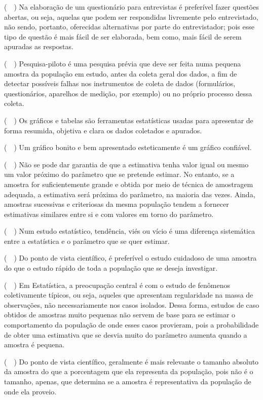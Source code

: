 \begin{enumerate}
	\subitem (~~) Na elaboração de um questionário para entrevistas é preferível fazer questões abertas,
ou seja, aquelas que podem ser respondidas livremente pelo entrevistado, não sendo,
portanto, oferecidas alternativas por parte do entrevistador; pois esse tipo de questão é
mais fácil de ser elaborada, bem como, mais fácil de serem apuradas as respostas.
	
	\subitem (~~) Pesquisa-piloto é uma pesquisa prévia que deve ser feita numa pequena amostra da
população em estudo, antes da coleta geral dos dados, a fim de detectar possíveis
falhas nos instrumentos de coleta de dados (formulários, questionários, aparelhos de
medição, por exemplo) ou no próprio processo dessa coleta.
		
	\subitem (~~) Os gráficos e tabelas são ferramentas estatísticas usadas para apresentar de forma
resumida, objetiva e clara os dados coletados e apurados.
	
	\subitem (~~) Um gráfico bonito e bem apresentado esteticamente é um gráfico confiável.
	
	\subitem (~~) Não se pode dar garantia de que a estimativa tenha valor igual ou mesmo um valor
próximo do parâmetro que se pretende estimar. No entanto, se a amostra for
suficientemente grande e obtida por meio de técnica de amostragem adequada, a
estimativa será próxima do parâmetro, na maioria das vezes. Ainda, amostras
sucessivas e criteriosas da mesma população tendem a fornecer estimativas
similares entre si e com valores em torno do parâmetro.
	
	\subitem (~~) Num estudo estatístico, tendência, viés ou vício é uma diferença sistemática entre a
estatística e o parâmetro que se quer estimar.
	
	\subitem (~~) Do ponto de vista científico, é preferível o estudo cuidadoso de uma amostra do que
o estudo rápido de toda a população que se deseja investigar.
	
	\subitem (~~) Em Estatística, a preocupação central é com o estudo de fenômenos coletivamente
típicos, ou seja, aqueles que apresentam regularidade na massa de observações, não
necessariamente nos casos isolados. Dessa forma, estudos de caso obtidos de
amostras muito pequenas não servem de base para se estimar o comportamento da
população de onde esses casos provieram, pois a probabilidade de obter uma
	estimativa que se desvia muito do parâmetro aumenta quando a amostra é pequena.
		
	\subitem (~~) Do ponto de vista científico, geralmente é mais relevante o tamanho absoluto da amostra
do que a porcentagem que ela representa da população, pois não é o tamanho, apenas,
que determina se a amostra é representativa da população de onde ela proveio.
	

\end{enumerate}
